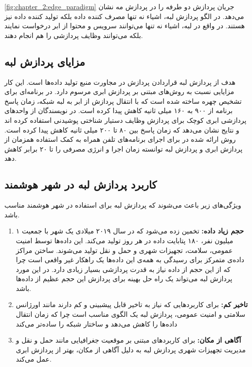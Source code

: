       \cref{fig:chapter_2:edge_paradigm} جریان پردازش دو طرفه را در پردازش مه نشان می‌دهد.
      در الگو پردازش لبه، اشیاء نه تنها مصرف کننده داده بلکه تولید کننده‌ داده نیز هستند.
      در واقع در لبه، اشیاء نه تنها می‌توانند سرویس و محتوا از ابر درخواست نمایند بلکه می‌توانند وظایف پردازشی را هم انجام دهند.

    \subsection{مزایای پردازش لبه}
      هدف از پردازش لبه قراردادن پردازش در مجاورت منبع تولید داده‌ها است.
      این کار مزایایی نسبت به روش‌های مبتنی بر پردازش ابری مرسوم دارد.
      در \cite{yi2015fog} برنامه‌ای برای تشخیص چهره ساخته شده است که با انتقال پردازش از ابر به لبه شبکه، زمان پاسخ برنامه از ۹۰۰ به ۱۶۰ میلی ثانیه کاهش پیدا کرده است.
      در \cite{ha2014towards} نویسندگان از واحدهای پردازشی ابری کوچک برای پردازش وظایف دستیار شناختی پوشیدنی استفاده کرده اند و نتایج نشان می‌دهد که زمان پاسخ بین ۸۰ تا ۲۰۰ میلی ثانیه کاهش پیدا کرده است.
      روش ارائه شده در \cite{chun2011clonecloud} برای اجرای برنامه‌های تلفن همراه به کمک استفاده همزمان از پردازش ابری و پردازش لبه توانسته زمان اجرا و انرژی مصرفی را تا ۲۰ برابر کاهش دهد.

    \subsection{کاربرد پردازش لبه در شهر هوشمند}
      ویژگی‌های زیر باعث می‌شوند که پردازش لبه برای استفاده در شهر هوشمند مناسب باشد.
      \begin{enumerate}
        \item \textbf{حجم زیاد داده:}
          تخمین زده می‌شود که در سال ۲۰۱۹ میلادی یک شهر با جمعیت ۱ میلیون نفر، ۱۸۰ پتابایت داده در هر روز تولید می‌کند\cite{index2015forecast}.
          این داده‌ها توسط امنیت عمومی، سلامت، تجهیزات شهری و حمل و نقل تولید می‌شوند.
          ساختن مراکز داده‌ی متمرکز برای رسیدگی به همه‌ی این داده‌ها یک راهکار غیر واقعی است چرا که از این حجم از داده نیاز به قدرت پردازشی بسیار زیادی دارد.
          در این مورد پردازش لبه می‌تواند یک راه حل بهینه برای پردازش این حجم عظیم از داده‌ها باشد.

        \item \textbf{تاخیر کم:}
          برای کاربرد‌هایی که نیاز به تاخیر قابل پیشبینی و کم دارند مانند اورژانس سلامتی و امنیت عمومی، پردازش لبه یک الگوی مناسب است چرا که زمان انتقال داده‌ها را کاهش می‌دهد و ساختار شبکه را ساده‌تر می‌کند
        \item \textbf{آگاهی از مکان:}
          برای کاربرد‌های مبتنی بر موقعیت جغرافیایی مانند حمل و نقل و مدیریت تجهیزات شهری پردازش لبه به دلیل آگاهی از مکان، بهتر از پردازش ابری عمل می‌کند.
      \end{enumerate}
  
